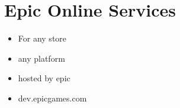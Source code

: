 \chapter{Epic Online Services}
    \begin{itemize}
        \item For any store
        \item any platform
        \item hosted by epic
        \item dev.epicgames.com
    \end{itemize}